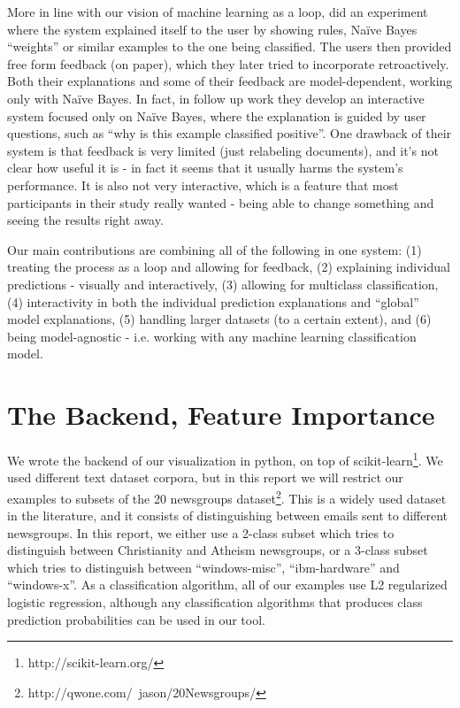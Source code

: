 \documentclass{chi2009}
\begin{document}
More in line with our vision of machine learning as a loop,
\cite{Stumpf:2009:IMM:1555003.1555106} did an experiment where the system
explained itself to the user by showing rules, Na\"{i}ve Bayes ``weights'' or
similar examples to the one being classified. The users then provided free form
feedback (on paper), which they later tried to incorporate retroactively. Both
their explanations and some of their feedback are model-dependent, working only
with Na\"{i}ve Bayes. In fact, in follow up work
\cite{Kulesza:2011:WED:2030365.2030367} they develop an interactive system
focused only on Na\"{i}ve Bayes, where the explanation is guided by user questions,
such as ``why is this example classified positive''. One drawback of their
system is that feedback is very limited (just relabeling documents), and it's
not clear how useful it is - in fact it seems that it usually harms the
system's performance. It is also not very interactive, which is a feature that
most participants in their study really wanted - being able to change something
and seeing the results right away. 

Our main contributions are combining all of the following in one system: (1)
treating the process as a loop and allowing for feedback, (2) explaining individual
predictions - visually and interactively, (3) allowing for multiclass
classification, (4) interactivity in both the individual prediction explanations
and ``global'' model explanations, (5) handling larger datasets (to a certain
extent), and (6) being model-agnostic - i.e. working with any machine learning
classification model.

\section{The Backend, Feature Importance}
We wrote the backend of our visualization in python, on top of
scikit-learn\footnote{http://scikit-learn.org/}. We used different text dataset
corpora, but in this report we will restrict our examples to subsets of the 20
newsgroups dataset\footnote{http://qwone.com/~jason/20Newsgroups/}. This is a
widely used dataset in the literature, and it consists of distinguishing between
emails sent to different newsgroups. In this report, we either use a 2-class
subset which tries to distinguish between Christianity and Atheism newsgroups,
or a 3-class subset which tries to distinguish between ``windows-misc'',
``ibm-hardware'' and ``windows-x''. As a classification algorithm, all of our
examples use L2 regularized logistic regression, although any classification
algorithms that produces class prediction probabilities can be used in our tool.
\end{document}

